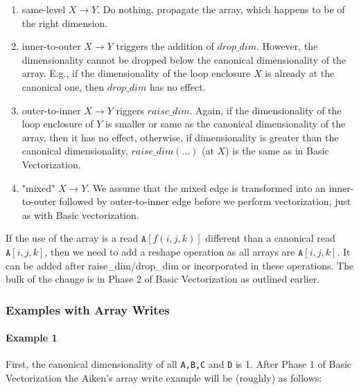 \begin{enumerate}

\item same-level $X \rightarrow Y$. Do nothing, propagate the array, which happens to be of the right dimension.

\item inner-to-outer $X \rightarrow Y$ triggers the addition of $\mathit{drop\_dim}$. However, the dimensionality cannot be dropped below the canonical dimensionality of the array. E.g., if the dimensionality of the loop enclosure $X$ is already at the canonical one, then $\mathit{drop\_dim}$ has no effect.

\item outer-to-inner $X \rightarrow Y$ riggers  $\mathit{raise\_dim}$. Again, if the dimensionality of the loop enclosure of $Y$ is smaller or same as the canonical dimensionality of the array, then it has no effect, otherwise, if dimensionality is greater than the canonical dimensionality, $\mathit{raise\_dim(...)}$ (at $X$) is the same as in Basic Vectorization.

\item "mixed" $X \rightarrow Y$. We assume that the mixed edge is transformed into an inner-to-outer followed by outer-to-inner edge before we perform vectorization, just as with Basic vectorization.

\end{enumerate}

If the use of the array is a read $\texttt{A}[f(i,j,k)]$ different than a canonical read $\texttt{A}[i,j,k]$, then we need to add a reshape operation as
all arrays are $\texttt{A}[i,j,k]$. It can be added after raise\_dim/drop\_dim or incorporated in these operations.
The bulk of the change is in Phase 2 of Basic Vectorization as outlined earlier.

\subsubsection{Examples with Array Writes}

\paragraph{Example 1}

First, the canonical dimensionality of all \texttt{A,B,C} and \texttt{D} is 1.
After Phase 1 of Basic Vectorization the Aiken's array write example will be (roughly) as follows:

